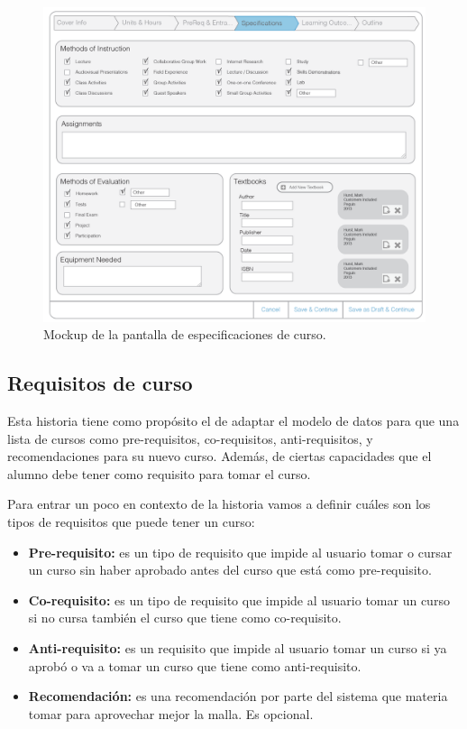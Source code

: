 \begin{figure}[H]
\centering
\includegraphics[scale=0.3]{Capitulos/DesarrollodelaAplicacion/Imagenes/course_specs}
\caption{Mockup de la pantalla de especificaciones de curso.}
  \label{course_specs}
\end{figure}

\subsection{Requisitos de curso}
Esta historia tiene como propósito el de adaptar el modelo de datos para que una lista de cursos como pre-requisitos, co-requisitos, anti-requisitos, y recomendaciones para su nuevo curso. Además, de ciertas capacidades que el alumno debe tener como requisito para tomar el curso.

Para entrar un poco en contexto de la historia vamos a definir cuáles son los tipos de requisitos que puede tener un curso:

\begin{itemize}
	\item \textbf{Pre-requisito:} es un tipo de requisito que impide al usuario tomar o cursar un curso sin haber aprobado antes del curso que está como pre-requisito.
	\item \textbf{Co-requisito:} es un tipo de requisito que impide al usuario tomar un curso si no cursa también el curso que tiene como co-requisito.
	\item \textbf{Anti-requisito:} es un requisito que impide al usuario tomar un curso si ya aprobó o va a tomar un curso que tiene como anti-requisito.
	\item \textbf{Recomendación:} es una recomendación por parte del sistema que materia tomar para aprovechar mejor la malla. Es opcional.
\end{itemize}

